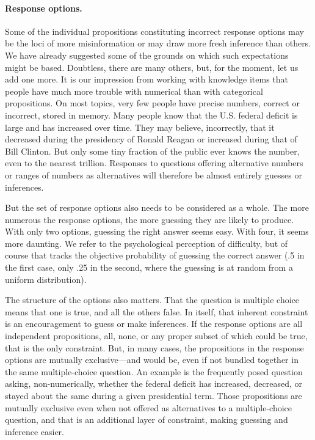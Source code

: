 \documentclass[11pt]{article}
\begin{document}
\paragraph{Response options.} Some of the individual propositions constituting incorrect response options may be the loci of more misinformation or may draw more fresh inference than others. We have already suggested some of the grounds on which such expectations might be based. Doubtless, there are many others, but, for the moment, let us add one more. It is our impression from working with knowledge items that people have much more trouble with numerical than with categorical propositions. On most topics, very few people have precise numbers, correct or incorrect, stored in memory. Many people know that the U.S. federal deficit is large and has increased over time. They may believe, incorrectly, that it decreased during the presidency of Ronald Reagan or increased during that of Bill Clinton. But only some tiny fraction of the public ever knows the number, even to the nearest trillion. Responses to questions offering alternative numbers or ranges of numbers as alternatives will therefore be almost entirely guesses or inferences.

But the set of response options also needs to be considered as a whole. The more numerous the response options, the more guessing they are likely to produce. With only two options, guessing the right answer seems easy. With four, it seems more daunting. We refer to the psychological perception of difficulty, but of course that tracks the objective probability of guessing the correct answer (.5 in the first case, only .25 in the second, where the guessing is at random from a uniform distribution).

The structure of the options also matters. That the question is multiple choice means that one is true, and all the others false. In itself, that inherent constraint is an encouragement to guess or make inferences. If the response options are all independent propositions, all, none, or any proper subset of which could be true, that is the only constraint. But, in many cases, the propositions in the response options are mutually exclusive---and would be, even if not bundled together in the same multiple-choice question. An example is the frequently posed question asking, non-numerically, whether the federal deficit has increased, decreased, or stayed about the same during a given presidential term. Those propositions are mutually exclusive even when not offered as alternatives to a multiple-choice question, and that is an additional layer of constraint, making guessing and inference easier.
\end{document}
